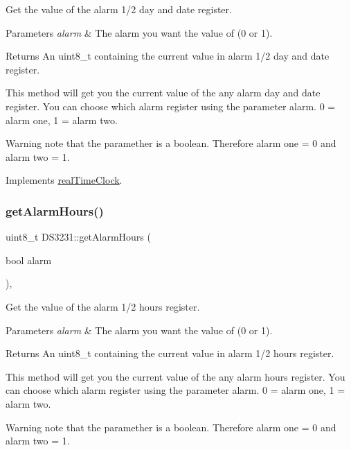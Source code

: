 Get the value of the alarm 1/2 day and date register. 


\begin{DoxyParams}{Parameters}
{\em alarm} & The alarm you want the value of (0 or 1). \\
\hline
\end{DoxyParams}
\begin{DoxyReturn}{Returns}
An uint8\+\_\+t containing the current value in alarm 1/2 day and date register.
\end{DoxyReturn}
This method will get you the current value of the any alarm day and date register. You can choose which alarm register using the parameter alarm. 0 = alarm one, 1 = alarm two. \begin{DoxyWarning}{Warning}
note that the paramether is a boolean. Therefore alarm one = 0 and alarm two = 1. 
\end{DoxyWarning}


Implements \mbox{\hyperlink{classreal_time_clock_afe0a54cb2f803d01df03e2ea8e86bbf9}{real\+Time\+Clock}}.

\mbox{\label{class_d_s3231_a8dc2f4546600209d16f109764c2f4434}} 
\subsubsection{\texorpdfstring{get\+Alarm\+Hours()}{getAlarmHours()}}
{\footnotesize\ttfamily uint8\+\_\+t D\+S3231\+::get\+Alarm\+Hours (\begin{DoxyParamCaption}\item[{bool}]{alarm }\end{DoxyParamCaption})\hspace{0.3cm}{\ttfamily [override]}, {\ttfamily [virtual]}}



Get the value of the alarm 1/2 hours register. 


\begin{DoxyParams}{Parameters}
{\em alarm} & The alarm you want the value of (0 or 1). \\
\hline
\end{DoxyParams}
\begin{DoxyReturn}{Returns}
An uint8\+\_\+t containing the current value in alarm 1/2 hours register.
\end{DoxyReturn}
This method will get you the current value of the any alarm hours register. You can choose which alarm register using the parameter alarm. 0 = alarm one, 1 = alarm two. \begin{DoxyWarning}{Warning}
note that the paramether is a boolean. Therefore alarm one = 0 and alarm two = 1. 
\end{DoxyWarning}


